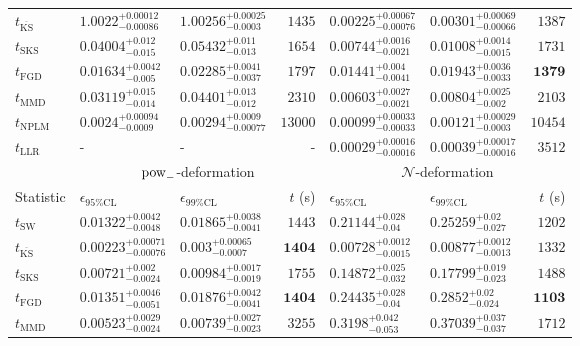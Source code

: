 \begin{tabular}{l|llr|llr}
	$t_{\overline{\mathrm{KS}}}$ & $1.0022_{-0.00086}^{+0.00012}$ & $1.00256_{-0.0003}^{+0.00025}$ & $1435$ & ${\mathbf{0.00225_{-0.00076}^{+0.00067}}}$ & ${\mathbf{0.00301_{-0.00066}^{+0.00069}}}$ & $1387$ \\
	$t_{\mathrm{SKS}}$ & $0.04004_{-0.015}^{+0.012}$ & $0.05432_{-0.013}^{+0.011}$ & $1654$ & $0.00744_{-0.0021}^{+0.0016}$ & $0.01008_{-0.0015}^{+0.0014}$ & $1731$ \\
	$t_{\mathrm{FGD}}$ & ${\mathbf{0.01634_{-0.005}^{+0.0042}}}$ & ${\mathbf{0.02285_{-0.0037}^{+0.0041}}}$ & $1797$ & $0.01441_{-0.0041}^{+0.004}$ & $0.01943_{-0.0033}^{+0.0036}$ & ${\mathbf{1379}}$ \\
	$t_{\mathrm{MMD}}$ & $0.03119_{-0.014}^{+0.015}$ & $0.04401_{-0.012}^{+0.013}$ & $2310$ & $0.00603_{-0.0021}^{+0.0027}$ & $0.00804_{-0.002}^{+0.0025}$ & $2103$ \\
\rowcolor{red!35}	$t_{\mathrm{NPLM}}$ & $0.0024_{-0.0009}^{+0.00094}$ & $0.00294_{-0.00077}^{+0.0009}$ & $13000$ & $0.00099_{-0.00033}^{+0.00033}$ & $0.00121_{-0.0003}^{+0.00029}$ & $10454$ \\
	$t_{\mathrm{LLR}}$ & - & - & - & $0.00029_{-0.00016}^{+0.00016}$ & $0.00039_{-0.00016}^{+0.00017}$ & $3512$ \\
	\toprule
	\multicolumn{1}{c}{} & \multicolumn{3}{c}{$\rm{pow}_{-}$-deformation} & \multicolumn{3}{c}{$\mathcal{N}$-deformation} \\
	Statistic & $\epsilon_{95\%\mathrm{CL}}$ & $\epsilon_{99\%\mathrm{CL}}$ & $t$ (s) & $\epsilon_{95\%\mathrm{CL}}$ & $\epsilon_{99\%\mathrm{CL}}$ & $t$ (s) \\
	\midrule
	$t_{\mathrm{SW}}$ & $0.01322_{-0.0048}^{+0.0042}$ & $0.01865_{-0.0041}^{+0.0038}$ & $1443$ & $0.21144_{-0.04}^{+0.028}$ & $0.25259_{-0.027}^{+0.02}$ & $1202$ \\
	$t_{\overline{\mathrm{KS}}}$ & ${\mathbf{0.00223_{-0.00076}^{+0.00071}}}$ & ${\mathbf{0.003_{-0.0007}^{+0.00065}}}$ & ${\mathbf{1404}}$ & ${\mathbf{0.00728_{-0.0015}^{+0.0012}}}$ & ${\mathbf{0.00877_{-0.0013}^{+0.0012}}}$ & $1332$ \\
	$t_{\mathrm{SKS}}$ & $0.00721_{-0.0024}^{+0.002}$ & $0.00984_{-0.0019}^{+0.0017}$ & $1755$ & $0.14872_{-0.032}^{+0.025}$ & $0.17799_{-0.023}^{+0.019}$ & $1488$ \\
	$t_{\mathrm{FGD}}$ & $0.01351_{-0.0051}^{+0.0046}$ & $0.01876_{-0.0041}^{+0.0042}$ & ${\mathbf{1404}}$ & $0.24435_{-0.04}^{+0.028}$ & $0.2852_{-0.024}^{+0.02}$ & ${\mathbf{1103}}$ \\
	$t_{\mathrm{MMD}}$ & $0.00523_{-0.0024}^{+0.0029}$ & $0.00739_{-0.0023}^{+0.0027}$ & $3255$ & $0.3198_{-0.053}^{+0.042}$ & $0.37039_{-0.037}^{+0.037}$ & $1712$ \\

\end{tabular}
